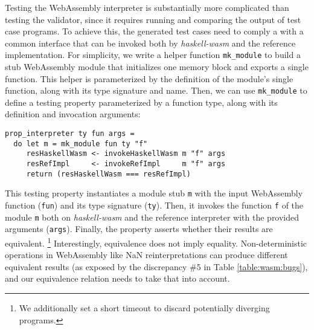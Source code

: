 \documentclass[sigconf,review,anonymous]{acmart}
\begin{document}
Testing the WebAssembly interpreter is substantially more complicated than
testing the validator, since it requires running and comparing the output of
test case programs.
%
To achieve this, the generated test cases need to comply a with a common
interface that can be invoked both by \textit{haskell-wasm} and the reference
implementation.
%
For simplicity, we write a helper function \texttt{mk\_module} to build a
stub WebAssembly module that initializes one memory block and exports a single
function.
%
This helper is parameterized by the definition of the module's single function,
along with its type signature and name.
%
%
%
Then, we can use \texttt{mk\_module} to define a testing property parameterized
by a function type, along with its definition and invocation arguments:



\begin{verbatim}
prop_interpreter ty fun args =
  do let m = mk_module fun ty "f"
     resHaskellWasm <- invokeHaskellWasm m "f" args
     resRefImpl     <- invokeRefImpl     m "f" args
     return (resHaskellWasm === resRefImpl)
\end{verbatim}

This testing property instantiates a module stub \texttt{m} with the input
WebAssembly function (\texttt{fun}) and its type signature (\texttt{ty}).
%
Then, it invokes the function \texttt{f} of the module \texttt{m} both on
\textit{haskell-wasm} and the reference interpreter with the provided arguments
(\texttt{args}).
%
Finally, the property asserts whether their results are equivalent.%
%
\footnote{We additionally set a short timeout to discard potentially diverging
  programs.}
%
Interestingly, equivalence does not imply equality.
%
Non-deterministic operations in WebAssembly like NaN reinterpretations can
produce different equivalent results (as exposed by the discrepancy \#5 in Table
\ref{table:wasm:bugs}), and our equivalence relation needs to take that into
account.
%
\end{document}
